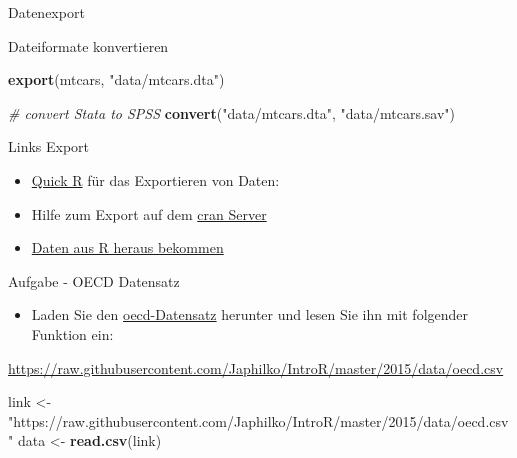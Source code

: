 \documentclass[ignorenonframetext,]{beamer}
\newenvironment{Shaded}{}{}
\newcommand{\KeywordTok}[1]{\textcolor[rgb]{0.00,0.44,0.13}{\textbf{{#1}}}}
\newcommand{\StringTok}[1]{\textcolor[rgb]{0.25,0.44,0.63}{{#1}}}
\newcommand{\CommentTok}[1]{\textcolor[rgb]{0.38,0.63,0.69}{\textit{{#1}}}}
\newcommand{\NormalTok}[1]{{#1}}
\providecommand{\tightlist}{%
\setlength{\itemsep}{0pt}\setlength{\parskip}{0pt}}
\begin{document}
\begin{frame}[fragile]{Datenexport}
\begin{block}{Dateiformate konvertieren}
\begin{Shaded}
\begin{Highlighting}[]
\KeywordTok{export}\NormalTok{(mtcars, }\StringTok{"data/mtcars.dta"}\NormalTok{)}

\CommentTok{# convert Stata to SPSS}
\KeywordTok{convert}\NormalTok{(}\StringTok{"data/mtcars.dta"}\NormalTok{, }\StringTok{"data/mtcars.sav"}\NormalTok{)}
\end{Highlighting}
\end{Shaded}

\end{block}

\begin{block}{Links Export}

\begin{itemize}
\item
  \href{http://www.statmethods.net/input/exportingdata.html}{Quick R}
  für das Exportieren von Daten:
\item
  Hilfe zum Export auf dem
  \href{http://cran.r-project.org/doc/manuals/r-release/R-data.pdf}{cran
  Server}
\item
  \href{https://www.stat.ubc.ca/~jenny/STAT545A/block05_getNumbersOut.html}{Daten
  aus R heraus bekommen}
\end{itemize}

\end{block}

\begin{block}{Aufgabe - OECD Datensatz}

\begin{itemize}
\tightlist
\item
  Laden Sie den
  \href{https://raw.githubusercontent.com/Japhilko/IntroR/master/2015/data/oecd.csv}{oecd-Datensatz}
  herunter und lesen Sie ihn mit folgender Funktion ein:
\end{itemize}

\url{https://raw.githubusercontent.com/Japhilko/IntroR/master/2015/data/oecd.csv}

\begin{Shaded}
\begin{Highlighting}[]
\NormalTok{link <-}\StringTok{ "https://raw.githubusercontent.com/Japhilko/IntroR/master/2015/data/oecd.csv"}
\NormalTok{data <-}\StringTok{ }\KeywordTok{read.csv}\NormalTok{(link)}
\end{Highlighting}
\end{Shaded}


\end{block}
\end{frame}
\end{document}
